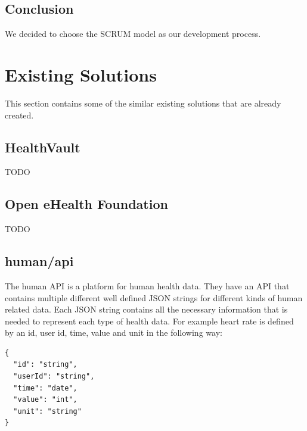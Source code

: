 \subsection{Conclusion}

We decided to choose the SCRUM model as our development process.	


\section{Existing Solutions}

This section contains some of the similar existing solutions that are already created.

\subsection{HealthVault}

TODO

\subsection{Open eHealth Foundation}

TODO

\subsection{human/api}

The human API is a platform for human health data. 
They have an API that contains multiple different well defined JSON strings for different kinds of human related data.
Each JSON string contains all the necessary information that is needed to represent each type of health data.
For example heart rate is defined by an id, user id, time, value and unit in the following way:

\begin{verbatim}
{
  "id": "string",
  "userId": "string",
  "time": "date",
  "value": "int",
  "unit": "string"
}
\end{verbatim}

